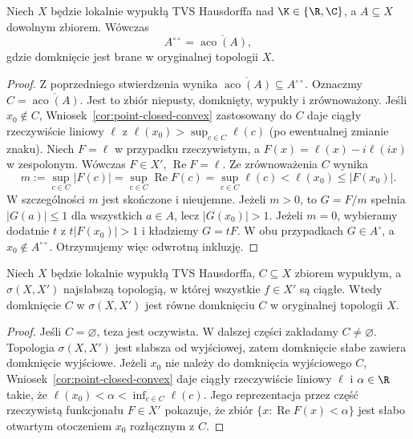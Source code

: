 \begin{twierdzenie}\label{thm:bipolar}
Niech $X$ będzie lokalnie wypukłą TVS Hausdorffa nad
$\K\in\{\R,\C\}$, a $A\subseteq X$ dowolnym zbiorem.
Wówczas
\[
 A^{\circ\circ}=\overline{\operatorname{aco}(A)},
\]
gdzie domknięcie jest brane w oryginalnej topologii $X$.
\end{twierdzenie}
\begin{proof}
Z poprzedniego stwierdzenia wynika
$\overline{\operatorname{aco}(A)}\subseteq A^{\circ\circ}$.
Oznaczmy $C=\overline{\operatorname{aco}(A)}$.
Jest to zbiór niepusty, domknięty, wypukły i zrównoważony.
Jeśli $x_0\notin C$, Wniosek~\ref{cor:point-closed-convex}
zastosowany do $C$ daje ciągły rzeczywiście liniowy
$\ell$ z $\ell(x_0)>\sup_{c\in C}\ell(c)$
(po ewentualnej zmianie znaku).
Niech $F=\ell$ w przypadku rzeczywistym, a
$F(x)=\ell(x)-i\ell(ix)$ w zespolonym.
Wówczas $F\in X'$, $\operatorname{Re}F=\ell$.
Ze zrównoważenia $C$ wynika
\[
 m:=\sup_{c\in C}|F(c)|=\sup_{c\in C}\operatorname{Re}F(c)
 =\sup_{c\in C}\ell(c)<\ell(x_0)\le|F(x_0)|.
\]
W szczególności $m$ jest skończone i nieujemne.
Jeżeli $m>0$, to $G=F/m$ spełnia $|G(a)|\le1$
dla wszystkich $a\in A$, lecz $|G(x_0)|>1$.
Jeżeli $m=0$, wybieramy dodatnie $t$ z
$t|F(x_0)|>1$ i kładziemy $G=tF$.
W obu przypadkach $G\in A^\circ$, a $x_0\notin A^{\circ\circ}$.
Otrzymujemy więc odwrotną inkluzję.
\end{proof}

\begin{wniosek}
\label{cor:weak-convex-closure}
Niech $X$ będzie lokalnie wypukłą TVS Hausdorffa,
$C\subseteq X$ zbiorem wypukłym, a $\sigma(X,X')$
najsłabszą topologią, w której wszystkie $f\in X'$
są ciągłe. Wtedy domknięcie $C$ w $\sigma(X,X')$
jest równe domknięciu $C$ w oryginalnej topologii $X$.
\end{wniosek}
\begin{proof}
Jeśli $C=\varnothing$, teza jest oczywista. W dalszej części
zakładamy $C\ne\varnothing$. Topologia $\sigma(X,X')$ jest słabsza od wyjściowej,
zatem domknięcie słabe zawiera domknięcie wyjściowe.
Jeżeli $x_0$ nie należy do domknięcia wyjściowego
$C$, Wniosek~\ref{cor:point-closed-convex}
daje ciągły rzeczywiście liniowy $\ell$
i $\alpha\in\R$ takie, że
$\ell(x_0)<\alpha<\inf_{c\in C}\ell(c)$.
Jego reprezentacja przez część rzeczywistą funkcjonału
$F\in X'$ pokazuje, że zbiór
$\{x:\operatorname{Re}F(x)<\alpha\}$ jest słabo otwartym
otoczeniem $x_0$ rozłącznym z $C$.
\end{proof}

